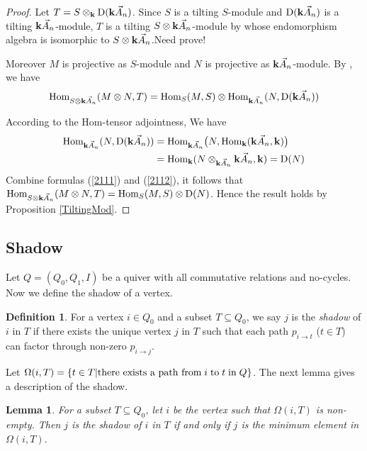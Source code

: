 \documentclass[a4paper, reqno]{amsart}
\newtheorem{lem}[thm]{Lemma}
\theoremstyle{definition}
\newtheorem{defn}[thm]{Definition}
\theoremstyle{remark}
\numberwithin{equation}{section}
\begin{document}
\begin{proof}
Let $T=S\otimes_{\bf k}\textup{D}({\bf k}\vec{A}_n)$. Since $S$ is a tilting $S$-module and $\textup{D}({\bf k} \vec{A}_n)$ is a tilting ${\bf k}\vec{A}_n$-module, $T$ is a tilting $S\otimes {\bf k}\vec{A}_n$-module by \cite[Theorem A]{Lad2012} {\color{red}whose endomorphism algebra is isomorphic to $S\otimes{\bf k}\vec{A}_n$.}{\color{blue}Need prove!}

Moreover $M$ is projective as $S$-module and $N$ is projective as ${\bf k}\vec{A}_n$-module. By \cite[Lemma 2.1]{Lad2012}, we have
\begin{equation}\label{2111}
\textup{Hom}_{S\otimes{\bf k}\vec{A}_n}(M\otimes N,T)=\textup{Hom}_{S}(M,S)\otimes\textup{Hom}_{{\bf k}\vec{A}_n}(N,\textup{D}({\bf k} \vec{A}_n))
\end{equation}

According to the Hom-tensor adjointness, We have
\begin{align}
\textup{Hom}_{{\bf k}\vec{A}_n}(N,\textup{D}({\bf k} \vec{A}_n))&=\textup{Hom}_{{\bf k}\vec{A}_n}\big(N,\textup{Hom}_{\bf k}({\bf k} \vec{A}_n,{\bf k})\big)\notag\\
&=\textup{Hom}_{\bf k}(N\otimes_{{\bf k}\vec{A}_n}{\bf k}\vec{A}_n,{\bf k})=\textup{D}(N)\label{2112}
\end{align}
Combine formulas (\ref{2111}) and (\ref{2112}), it follows that $\textup{Hom}_{S\otimes{\bf k}\vec{A}_n}(M\otimes N,T)=\textup{Hom}_{S}(M,S)\otimes\textup{D}(N)$. Hence the result holds by Proposition \ref{TiltingMod}.
\end{proof}

\subsection{Shadow}
Let $Q=(Q_0,Q_1,I)$ be a quiver with all commutative relations and no-cycles. Now we define the shadow of a vertex.
\begin{defn}
For a vertex $i\in Q_0$ and a subset $T\subseteq Q_0$, we say $j$ is the \emph{shadow} of $i$ in $T$ if there exists the unique vertex $j$ in $T$ such that each path $p_{i\to t}$ ($t\in T$) can factor through non-zero $p_{i\to j}$.
\end{defn}

Let $\Omega(i,T)=\{t\in T|\textup{there exists a path from}\;i\;\textup{to}\;t\;\textup{in}\;Q\}$. The next lemma gives a description of the shadow.
\begin{lem}
For a subset $T\subseteq Q_0$, let $i$ be the vertex such that $\Omega(i,T)$ is non-empty. Then $j$ is the shadow of $i$ in $T$ if and only if $j$ is the minimum element in $\Omega(i,T)$.
\end{lem}
\end{document}
